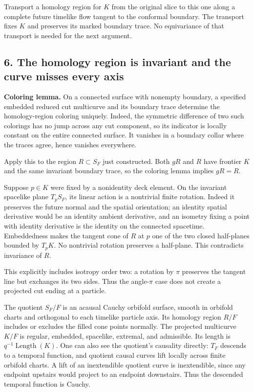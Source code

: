 \documentclass[11pt]{article}
\begin{document}
Transport a homology region for \(K\) from the original slice to this
one along a complete future timelike flow tangent to the conformal
boundary. The transport fixes \(K\) and preserves its marked boundary
trace. No equivariance of that transport is needed for the next
argument.

\subsection{6. The homology region is invariant and the curve misses
every
axis}\label{the-homology-region-is-invariant-and-the-curve-misses-every-axis}

\textbf{Coloring lemma.} On a connected surface with nonempty boundary,
a specified embedded reduced cut multicurve and its boundary trace
determine the homology-region coloring uniquely. Indeed, the symmetric
difference of two such colorings has no jump across any cut component,
so its indicator is locally constant on the entire connected surface. It
vanishes in a boundary collar where the traces agree, hence vanishes
everywhere.

Apply this to the region \(R\subset S_F\) just constructed. Both \(gR\)
and \(R\) have frontier \(K\) and the same invariant boundary trace, so
the coloring lemma implies \(gR=R\).

Suppose \(p\in K\) were fixed by a nonidentity deck element. On the
invariant spacelike plane \(T_pS_F\), its linear action is a nontrivial
finite rotation. Indeed it preserves the future normal and the spatial
orientation; an identity spatial derivative would be an identity ambient
derivative, and an isometry fixing a point with identity derivative is
the identity on the connected spacetime. Embeddedness makes the tangent
cone of \(R\) at \(p\) one of the two closed half-planes bounded by
\(T_pK\). No nontrivial rotation preserves a half-plane. This
contradicts invariance of \(R\).

This explicitly includes isotropy order two: a rotation by \(\pi\)
preserves the tangent line but exchanges its two sides. Thus the
angle-\(\pi\) case does not create a projected cut ending at a particle.

The quotient \(S_F/F\) is an acausal Cauchy orbifold surface, smooth in
orbifold charts and orthogonal to each timelike particle axis. Its
homology region \(R/F\) includes or excludes the filled cone points
normally. The projected multicurve \(K/F\) is regular, embedded,
spacelike, extremal, and admissible. Its length is
\(q^{-1}\operatorname{Length}(K)\). One can also see the quotient's
causality directly: \(T_F\) descends to a temporal function, and
quotient causal curves lift locally across finite orbifold charts. A
lift of an inextendible quotient curve is inextendible, since any
endpoint upstairs would project to an endpoint downstairs. Thus the
descended temporal function is Cauchy.
\end{document}
